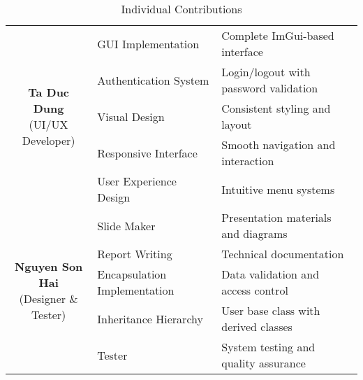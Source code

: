 \begin{center}
\begin{table}[H]
\begin{tabularx}{\textwidth}{| c | l | X |}
			\multirow{5}{*}{\parbox{3.5cm}{\centering\textbf{Ta Duc Dung}                                       \\ \small{(UI/UX Developer)}}}
			              & GUI Implementation          & Complete ImGui-based interface                        \\
			\cline{2-3}
			              & Authentication System       & Login/logout with password validation                 \\
			\cline{2-3}
			              & Visual Design               & Consistent styling and layout                         \\
			\cline{2-3}
			              & Responsive Interface        & Smooth navigation and interaction                     \\
			\cline{2-3}
			              & User Experience Design      & Intuitive menu systems                                \\
			\hline

			\multirow{6}{*}{\parbox{3.5cm}{\centering\textbf{Nguyen Son Hai}                                    \\ \small{(Designer \& Tester)}}}
			              & Slide Maker                 & Presentation materials and diagrams                   \\
			\cline{2-3}
			              & Report Writing              & Technical documentation                               \\
			\cline{2-3}
			 & Encapsulation Implementation & Data validation and access control \\
			\cline{2-3}
			 & Inheritance Hierarchy & User base class with derived classes \\
			\cline{2-3}
			              & Tester                      & System testing and quality assurance                  \\
			\hline
		\end{tabularx}
		\caption{Individual Contributions}
	\end{table}
\end{center}

\newpage

